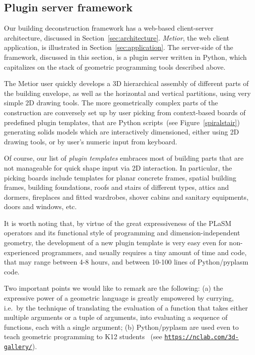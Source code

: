 \vspace{-3mm}\subsection{Plugin server framework}\vspace{-3mm}

Our building deconstruction framework  has a web-based client-server architecture,  discussed in Section~\ref{sec:architecture}. 	\emph{Metior}, the web client application, is illustrated in Section~\ref{sec:application}. The server-side of the framework, discussed in this section, is a  plugin server written in Python, which capitalizes on the stack of geometric programming tools described above. 

The Metior user quickly develops a 3D hierarchical assembly of different parts of the building envelope, as well as the horizontal and vertical partitions, using very simple 2D drawing tools. The more geometrically complex parts of the construction are conversely set up by user picking from context-based boards of predefined plugin templates, that are Python scripts~(see Figure~\ref{spiralstair}) generating solids models which are interactively dimensioned, either using 2D drawing tools, or by user's numeric input from keyboard. 

Of course, our list of \emph{plugin templates} embraces most of building parts that are not manageable for quick shape input via 2D interaction. In particular, the picking boards include templates for planar concrete frames, spatial building frames, building foundations, roofs and stairs of different types, attics and dormers, fireplaces and fitted wardrobes, shover cabins and sanitary equipments, doors and windows, etc.

It is worth noting that, by virtue of the great expressiveness of the PLaSM operators and its functional style of programming and dimension-independent geometry, the development of a new plugin template is very easy even for non-experienced programmers, and usually requires a tiny amount of time and code, that may range between 4-8 hours, and between 10-100 lines of Python/pyplasm code. 

Two important points we would like to remark are the following: (a) the expressive power of a geometric language is greatly empowered by  currying, i.e.~by the technique of translating the evaluation of a function that takes either multiple arguments or a tuple of arguments, into evaluating a sequence of functions, each with a single argument; (b) Python/pyplasm are used even to teach geometric programming to K12 students~\cite{ncLab} (see \href{https://nclab.com/3d-gallery/}{\texttt{https://nclab.com/3d-gallery/}}). 

